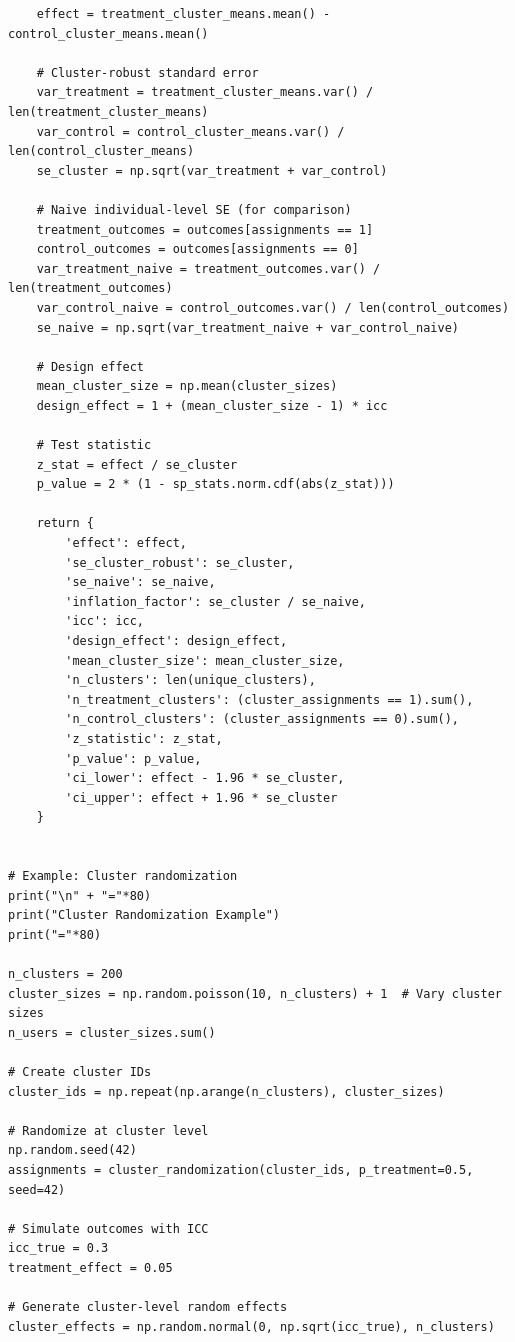 \begin{lstlisting}
    effect = treatment_cluster_means.mean() - control_cluster_means.mean()

    # Cluster-robust standard error
    var_treatment = treatment_cluster_means.var() / len(treatment_cluster_means)
    var_control = control_cluster_means.var() / len(control_cluster_means)
    se_cluster = np.sqrt(var_treatment + var_control)

    # Naive individual-level SE (for comparison)
    treatment_outcomes = outcomes[assignments == 1]
    control_outcomes = outcomes[assignments == 0]
    var_treatment_naive = treatment_outcomes.var() / len(treatment_outcomes)
    var_control_naive = control_outcomes.var() / len(control_outcomes)
    se_naive = np.sqrt(var_treatment_naive + var_control_naive)

    # Design effect
    mean_cluster_size = np.mean(cluster_sizes)
    design_effect = 1 + (mean_cluster_size - 1) * icc

    # Test statistic
    z_stat = effect / se_cluster
    p_value = 2 * (1 - sp_stats.norm.cdf(abs(z_stat)))

    return {
        'effect': effect,
        'se_cluster_robust': se_cluster,
        'se_naive': se_naive,
        'inflation_factor': se_cluster / se_naive,
        'icc': icc,
        'design_effect': design_effect,
        'mean_cluster_size': mean_cluster_size,
        'n_clusters': len(unique_clusters),
        'n_treatment_clusters': (cluster_assignments == 1).sum(),
        'n_control_clusters': (cluster_assignments == 0).sum(),
        'z_statistic': z_stat,
        'p_value': p_value,
        'ci_lower': effect - 1.96 * se_cluster,
        'ci_upper': effect + 1.96 * se_cluster
    }


# Example: Cluster randomization
print("\n" + "="*80)
print("Cluster Randomization Example")
print("="*80)

n_clusters = 200
cluster_sizes = np.random.poisson(10, n_clusters) + 1  # Vary cluster sizes
n_users = cluster_sizes.sum()

# Create cluster IDs
cluster_ids = np.repeat(np.arange(n_clusters), cluster_sizes)

# Randomize at cluster level
np.random.seed(42)
assignments = cluster_randomization(cluster_ids, p_treatment=0.5, seed=42)

# Simulate outcomes with ICC
icc_true = 0.3
treatment_effect = 0.05

# Generate cluster-level random effects
cluster_effects = np.random.normal(0, np.sqrt(icc_true), n_clusters)


\end{lstlisting}
